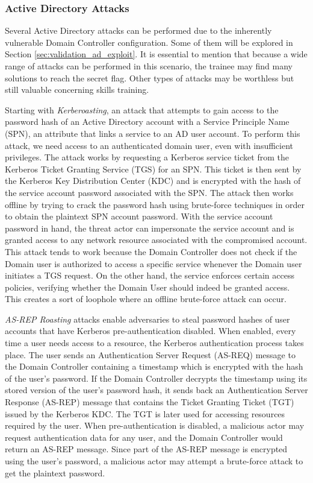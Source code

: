 \subsubsection{Active Directory Attacks} \label{sec:validation_ad_attacks}

Several Active Directory attacks can be performed due to the inherently vulnerable Domain Controller configuration. Some of them will be explored in Section \ref{sec:validation_ad_exploit}. It is essential to mention that because a wide range of attacks can be performed in this scenario, the trainee may find many solutions to reach the secret flag. Other types of attacks may be worthless but still valuable concerning skills training.

Starting with \textit{Kerberoasting}, an attack that attempts to gain access to the password hash of an Active Directory account with a Service Principle Name (SPN), an attribute that links a service to an AD user account. To perform this attack, we need access to an authenticated domain user, even with insufficient privileges. The attack works by requesting a Kerberos service ticket from the Kerberos Ticket Granting Service (TGS) for an SPN. This ticket is then sent by the Kerberos Key Distribution Center (KDC) and is encrypted with the hash of the service account password associated with the SPN. The attack then works offline by trying to crack the password hash using brute-force techniques in order to obtain the plaintext SPN account password. With the service account password in hand, the threat actor can impersonate the service account and is granted access to any network resource associated with the compromised account. This attack tends to work because the Domain Controller does not check if the Domain user is authorized to access a specific service whenever the Domain user initiates a TGS request. On the other hand, the service enforces certain access policies, verifying whether the Domain User should indeed be granted access. This creates a sort of loophole where an offline brute-force attack can occur.

\textit{AS-REP Roasting} attacks enable adversaries to steal password hashes of user accounts that have Kerberos pre-authentication disabled. When enabled, every time a user needs access to a resource, the Kerberos authentication process takes place. The user sends an Authentication Server Request (AS-REQ) message to the Domain Controller containing a timestamp which is encrypted with the hash of the user's password. If the Domain Controller decrypts the timestamp using its stored version of the user's password hash, it sends back an Authentication Server Response (AS-REP) message that contains the Ticket Granting Ticket (TGT) issued by the Kerberos KDC. The TGT is later used for accessing resources required by the user. When pre-authentication is disabled, a malicious actor may request authentication data for any user, and the Domain Controller would return an AS-REP message. Since part of the AS-REP message is encrypted using the user's password, a malicious actor may attempt a brute-force attack to get the plaintext password. 

